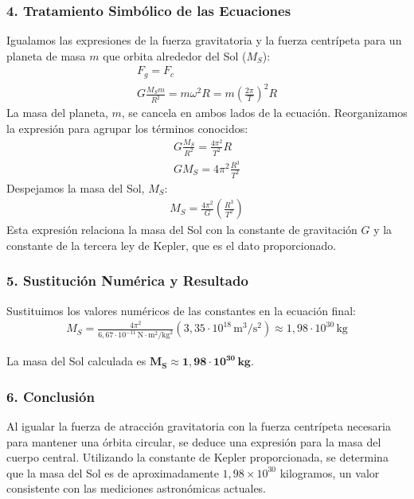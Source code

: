 \subsubsection*{4. Tratamiento Simbólico de las Ecuaciones}
Igualamos las expresiones de la fuerza gravitatoria y la fuerza centrípeta para un planeta de masa $m$ que orbita alrededor del Sol ($M_S$):
\begin{gather}
    F_g = F_c \nonumber \\
    G \frac{M_S m}{R^2} = m \omega^2 R = m \left(\frac{2\pi}{T}\right)^2 R
\end{gather}
La masa del planeta, $m$, se cancela en ambos lados de la ecuación. Reorganizamos la expresión para agrupar los términos conocidos:
\begin{gather}
    G \frac{M_S}{R^2} = \frac{4\pi^2}{T^2} R \nonumber \\
    G M_S = 4\pi^2 \frac{R^3}{T^2}
\end{gather}
Despejamos la masa del Sol, $M_S$:
\begin{gather}
    M_S = \frac{4\pi^2}{G} \left(\frac{R^3}{T^2}\right)
\end{gather}
Esta expresión relaciona la masa del Sol con la constante de gravitación $G$ y la constante de la tercera ley de Kepler, que es el dato proporcionado.

\subsubsection*{5. Sustitución Numérica y Resultado}
Sustituimos los valores numéricos de las constantes en la ecuación final:
\begin{gather}
    M_S = \frac{4\pi^2}{6,67 \cdot 10^{-11} \, \text{N}\cdot\text{m}^2/\text{kg}^2} \left(3,35 \cdot 10^{18} \, \text{m}^3/\text{s}^2\right) \approx 1,98 \cdot 10^{30} \, \text{kg}
\end{gather}
\begin{cajaresultado}
    La masa del Sol calculada es $\boldsymbol{M_S \approx 1,98 \cdot 10^{30} \, \textbf{kg}}$.
\end{cajaresultado}

\subsubsection*{6. Conclusión}
\begin{cajaconclusion}
    Al igualar la fuerza de atracción gravitatoria con la fuerza centrípeta necesaria para mantener una órbita circular, se deduce una expresión para la masa del cuerpo central. Utilizando la constante de Kepler proporcionada, se determina que la masa del Sol es de aproximadamente $1,98 \times 10^{30}$ kilogramos, un valor consistente con las mediciones astronómicas actuales.
\end{cajaconclusion}

